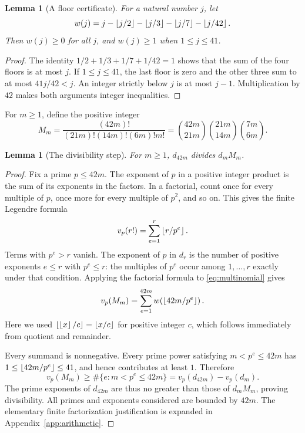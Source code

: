 \documentclass[11pt]{article}
\newtheorem{lemma}[theorem]{Lemma}
\theoremstyle{definition}\newtheorem{definition}[theorem]{Definition}
\theoremstyle{remark}\newtheorem{remark}[theorem]{Remark}
\begin{document}
\begin{lemma}[A floor certificate]\label{lem:floor}
For a natural number $j$, let
\[
 w(j)=j-\left\lfloor j/2\right\rfloor-\left\lfloor j/3\right\rfloor-\left\lfloor j/7\right\rfloor-\left\lfloor j/42\right\rfloor.
\]
Then $w(j)\ge0$ for all $j$, and $w(j)\ge1$ when $1\le j\le41$.
\end{lemma}
\begin{proof}
The identity $1/2+1/3+1/7+1/42=1$ shows that the sum of the four floors is
at most $j$. If $1\le j\le41$, the last floor is zero and the other three
sum to at most $41j/42<j$. An integer strictly below $j$ is at most $j-1$.
Multiplication by $42$ makes both arguments integer inequalities.
\end{proof}

For $m\ge1$, define the positive integer
\begin{equation}\label{eq:multinomial}
 M_m=\frac{(42m)!}{(21m)!(14m)!(6m)!m!}
     =\binom{42m}{21m}\binom{21m}{14m}\binom{7m}{6m}.
\end{equation}

\begin{lemma}[The divisibility step]\label{lem:lcm-div}
For $m\ge1$, $d_{42m}$ divides $d_mM_m$.
\end{lemma}
\begin{proof}
Fix a prime $p\le42m$. The exponent of $p$ in a positive integer product
is the sum of its exponents in the factors. In a factorial, count once
for every multiple of $p$, once more for every multiple of $p^2$, and so
on. This gives the finite Legendre formula
\[
 v_p(r!)=\sum_{e=1}^{r}\left\lfloor r/p^e\right\rfloor.
\]
Terms with $p^e>r$ vanish. The exponent of $p$ in $d_r$ is the number of
positive exponents $e\le r$ with $p^e\le r$: the multiples of $p^e$ occur
among $1,\ldots,r$ exactly under that condition. Applying the factorial
formula to \eqref{eq:multinomial} gives
\[
 v_p(M_m)=\sum_{e=1}^{42m}
          w\!\left(\left\lfloor42m/p^e\right\rfloor\right).
\]
Here we used $\left\lfloor\left\lfloor x\right\rfloor/c\right\rfloor=\left\lfloor x/c\right\rfloor$ for positive integer $c$,
which follows immediately from quotient and remainder.

Every summand is nonnegative. Every prime power satisfying
$m<p^e\le42m$ has $1\le\left\lfloor42m/p^e\right\rfloor\le41$, and hence contributes
at least $1$. Therefore
\[
 v_p(M_m)\ge\#\{e:m<p^e\le42m\}
             =v_p(d_{42m})-v_p(d_m).
\]
The prime exponents of $d_{42m}$ are thus no greater than those of
$d_mM_m$, proving divisibility. All primes and exponents considered are
bounded by $42m$. The elementary finite factorization justification is
expanded in Appendix~\ref{app:arithmetic}.
\end{proof}
\end{document}

